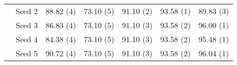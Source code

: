 \begin{table}[t]
\begin{tabular}{l l c c c c c}
         \cmidrule{2-7}
         & Seed 2 & 88.82 (4) & 73.10 (5) & 91.10 (2) & 93.58 (1) & 89.83 (3)   \\
         \cmidrule{2-7}
         & Seed 3 & 86.83 (4) & 73.10 (5) & 91.10 (3) & 93.58 (2) & 96.00 (1)    \\
         \cmidrule{2-7}
         & Seed 4 & 84.38 (4) & 73.10 (5) & 91.10 (3) & 93.58 (2) & 95.48 (1)   \\
         \cmidrule{2-7}
         & Seed 5 & 90.72 (4) & 73.10 (5) & 91.10 (3) & 93.58 (2) & 96.04 (1)   \\
        \bottomrule
    \end{tabular}
    \label{tab:accuracy_per_environment_fashionmnist}
\end{table}















 
























 










